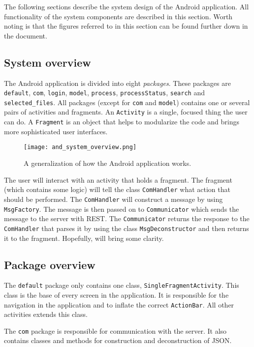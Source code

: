 The following sections describe the system design of the Android application. All functionality of the system components are described in this section. Worth noting is that the figures referred to in this section can be found further down in the document.

\subsection{System overview}
	The Android application is divided into eight \emph{packages}. These packages are \verb!default!, \verb!com!, \verb!login!, \verb!model!, \verb!process!, \verb!processStatus!, \verb!search! and \verb!selected_files!.
	All packages (except for \verb!com! and \verb!model!) contains one or several pairs of activities and fragments. An \verb!Activity! is a single, focused thing the user can do. A \verb!Fragment! is an object that helps to modularize the code and brings more sophisticated user 	interfaces.

	\begin{figure}[h]
		\centering
		\texttt{[image: and\_system\_overview.png]}
		\caption{\label{fig:and_system_overview}A generalization of how the Android application works.}
	\end{figure}

	The user will interact with an activity that holds a fragment. The fragment (which contains some logic) will tell the class \verb!ComHandler! what action that should be performed. The \verb!ComHandler! will construct a message by using \verb!MsgFactory!. The message is then passed on to \verb!Communicator! which sends the message to the server with REST. The \verb!Communicator! returns the response to the \verb!ComHandler! that parses it by using the class \verb!MsgDeconstructor! and then returns it to the fragment. Hopefully,  will bring some clarity.
	
\subsection{Package overview}
	The \verb!default! package only contains one class, \verb!SingleFragmentActivity!. This class is the base of every screen in the application. It is responsible for the navigation in the application and to inflate the correct \verb!ActionBar!. All other activities extends this 	class.

	The \verb!com! package is responsible for communication with the server. It also contains classes and methods for construction and deconstruction of JSON.

